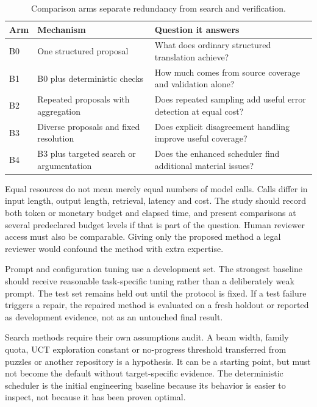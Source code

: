 \documentclass[12pt,a4paper,oneside,openany]{book}
\begin{document}
\begin{table}[htbp]
\centering\small
\caption{Comparison arms separate redundancy from search and verification.}
\begin{tabularx}{\textwidth}{P{16mm}YY}
\toprule
Arm & Mechanism & Question it answers\\
\midrule
B0 & One structured proposal & What does ordinary structured translation achieve?\\
B1 & B0 plus deterministic checks & How much comes from source coverage and validation alone?\\
B2 & Repeated proposals with aggregation & Does repeated sampling add useful error detection at equal cost?\\
B3 & Diverse proposals and fixed resolution & Does explicit disagreement handling improve useful coverage?\\
B4 & B3 plus targeted search or argumentation & Does the enhanced scheduler find additional material issues?\\
\bottomrule
\end{tabularx}
\end{table}

Equal resources do not mean merely equal numbers of model calls. Calls differ in
input length, output length, retrieval, latency and cost. The study should record
both token or monetary budget and elapsed time, and present comparisons at
several predeclared budget levels if that is part of the question. Human reviewer
access must also be comparable. Giving only the proposed method a legal reviewer
would confound the method with extra expertise.

Prompt and configuration tuning use a development set. The strongest baseline
should receive reasonable task-specific tuning rather than a deliberately weak
prompt. The test set remains held out until the protocol is fixed. If a test
failure triggers a repair, the repaired method is evaluated on a fresh holdout or
reported as development evidence, not as an untouched final result.

Search methods require their own assumptions audit. A beam width, family quota,
UCT exploration constant or no-progress threshold transferred from puzzles or
another repository is a hypothesis. It can be a starting point, but must not
become the default without target-specific evidence. The deterministic scheduler
is the initial engineering baseline because its behavior is easier to inspect,
not because it has been proven optimal.
\end{document}
